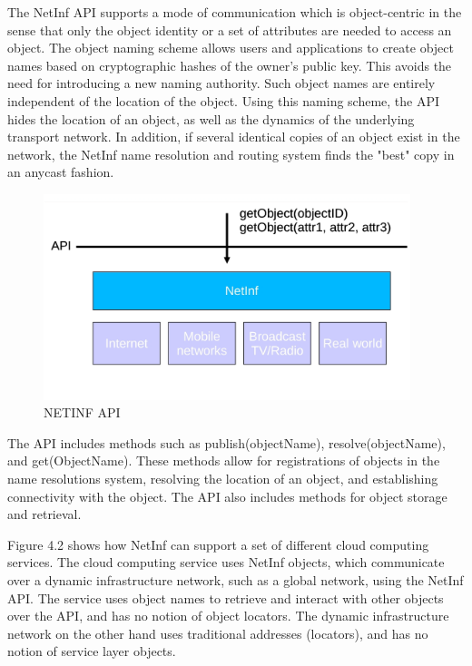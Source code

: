 The NetInf API supports a mode of communication
which is object-centric in the sense that only the object
identity or a set of attributes are needed to access an object.
The object naming scheme allows users and applications to
create object names based on cryptographic hashes of the
owner’s public key. This avoids the need for introducing a
new naming authority. Such object names are entirely
independent of the location of the object. Using this naming
scheme, the API hides the location of an object, as well as
the dynamics of the underlying transport network. In
addition, if several identical copies of an object exist in the
network, the NetInf name resolution and routing system
finds the "best" copy in an anycast fashion.

\begin{figure}[h]
\begin{center}
\includegraphics[height=6cm]{3.jpg}
\caption{NETINF API}
\end{center}
\end{figure}

The API includes methods such as publish(objectName),
resolve(objectName), and get(ObjectName). These methods
allow for registrations of objects in the name resolutions
system, resolving the location of an object, and establishing
connectivity with the object. The API also includes methods
for object storage and retrieval.

Figure 4.2 shows how NetInf can support a set of different
cloud computing services. The cloud computing service uses
NetInf objects, which communicate over a dynamic
infrastructure network, such as a global network, using the
NetInf API. The service uses object names to retrieve and
interact with other objects over the API, and has no notion of
object locators. The dynamic infrastructure network on the
other hand uses traditional addresses (locators), and has no
notion of service layer objects.



